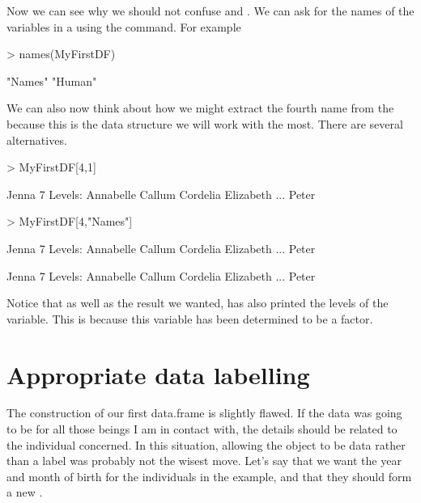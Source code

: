  
Now we can see why we should not confuse  and . We can ask for the names of the variables in a  using the  command. For example 

\begin{Schunk}
\begin{Sinput}
> names(MyFirstDF) 
\end{Sinput}
\begin{Soutput}
[1] "Names" "Human"
\end{Soutput}
\end{Schunk}

 
We can also now think about how we might extract the fourth name from the  because this is the data structure we will work with the most. There are several alternatives. 

\begin{Schunk}
\begin{Sinput}
> MyFirstDF[4,1] 
\end{Sinput}
\begin{Soutput}
[1] Jenna
7 Levels: Annabelle Callum Cordelia Elizabeth ... Peter
\end{Soutput}
\begin{Sinput}
> MyFirstDF[4,"Names"] 
\end{Sinput}
\begin{Soutput}
[1] Jenna
7 Levels: Annabelle Callum Cordelia Elizabeth ... Peter
\end{Soutput}
\begin{Soutput}
[1] Jenna
7 Levels: Annabelle Callum Cordelia Elizabeth ... Peter
\end{Soutput}
\end{Schunk}

 
Notice that as well as the result we wanted, \R{} has also printed the levels of the  variable. This is because this variable has been determined to be a factor. 
 
 
 
\section{Appropriate data labelling} 
 
The construction of our first data.frame is slightly flawed. If the  data was going to be for all those beings I am in contact with, the details should be related to the individual concerned. In this situation, allowing the  object to be data rather than a label was probably not the wisest move. Let's say that we want the year and month of birth for the individuals in the example, and that they should form a new . 


